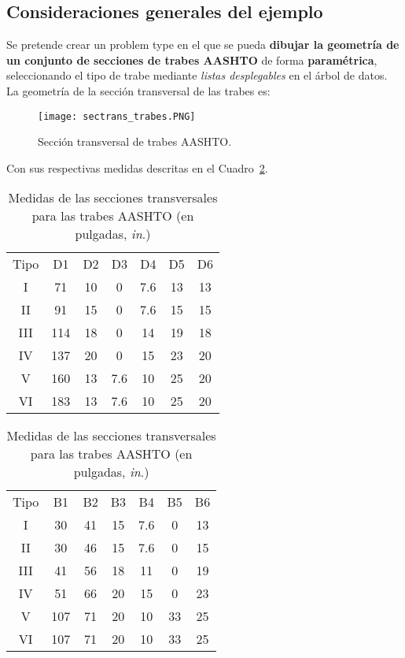 \documentclass[10pt, a4paper, twocolumn]{article}
\begin{document}
\subsection{Consideraciones generales del ejemplo} \label{sec:consideraciones}

Se pretende crear un problem type en el que se pueda \textbf{dibujar la geometría de un conjunto de secciones de trabes AASHTO} de forma \textbf{paramétrica}, seleccionando el tipo de trabe mediante \textit{listas desplegables} en el árbol de datos. La geometría de la sección transversal de las trabes es:

\begin{figure}[hbt!]
	\centering
	\texttt{[image: sectrans\_trabes.PNG]}
	\caption{Sección transversal de trabes AASHTO.\label{fig:sectrans_trabes}}
\end{figure}

Con sus respectivas medidas descritas en el Cuadro~\ref{tab:medidasAASHTO}.

\begin{table}[hbtp!]
\centering
	\begin{tabular}{*{7}{c}}
		\rowcolor{BlueGiD!60} Tipo&D1&D2&D3&D4&D5&D6\\
		\rowcolor{BlueGiD!20} I&71&10&0&7.6&13&13\\
		II&91&15&0&7.6&15&15\\
		\rowcolor{BlueGiD!20}III&114&18&0&14&19&18\\
		IV&137&20&0&15&23&20\\
		\rowcolor{BlueGiD!20}V&160&13&7.6&10&25&20\\
		VI&183&13&7.6&10&25&20\\
	\end{tabular}
	\vspace{0.2cm}
	\begin{tabular}{*{7}{c}}
		\rowcolor{BlueGiD!60} Tipo&B1&B2&B3&B4&B5&B6\\
		\rowcolor{BlueGiD!20} I&30&41&15&7.6&0&13\\
		II&30&46&15&7.6&0&15\\
		\rowcolor{BlueGiD!20}III&41&56&18&11&0&19\\
		IV&51&66&20&15&0&23\\
		\rowcolor{BlueGiD!20}V&107&71&20&10&33&25\\
		VI&107&71&20&10&33&25\\
	\end{tabular}
	\caption{Medidas de las secciones transversales para las trabes AASHTO (en pulgadas, \textit{in}.\label{tab:medidasAASHTO})}
\end{table}
\end{document}

